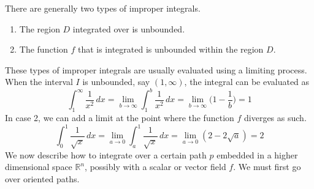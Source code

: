   There are generally two types of improper integrals. 
  \begin{enumerate}
    \item The region $D$ integrated over is unbounded. 
    \item The function $f$ that is integrated is unbounded within the region $D$.
  \end{enumerate}

  These types of improper integrals are usually evaluated using a limiting process. When the interval $I$ is unbounded, say $(1, \infty)$, the integral can be evaluated as 
  \begin{equation}
    \int_1^\infty \frac{1}{x^2} \,dx = \lim_{b \rightarrow \infty} \int_1^b \frac{1}{x^2} \, dx = \lim_{b\rightarrow \infty} \bigg( 1 - \frac{1}{b} \bigg) = 1
  \end{equation}
  In case 2, we can add a limit at the point where the function $f$ diverges as such. 
  \begin{equation}
    \int_0^1 \frac{1}{\sqrt{x}} \, dx = \lim_{a \rightarrow 0} \int_a^1 \frac{1}{\sqrt{x}} \, dx = \lim_{a \rightarrow 0} (2 - 2\sqrt{a}) = 2
  \end{equation}
  We now describe how to integrate over a certain path $p$ embedded in a higher dimensional space $\mathbb{R}^n$, possibly with a scalar or vector field $f$. We must first go over oriented paths. 

